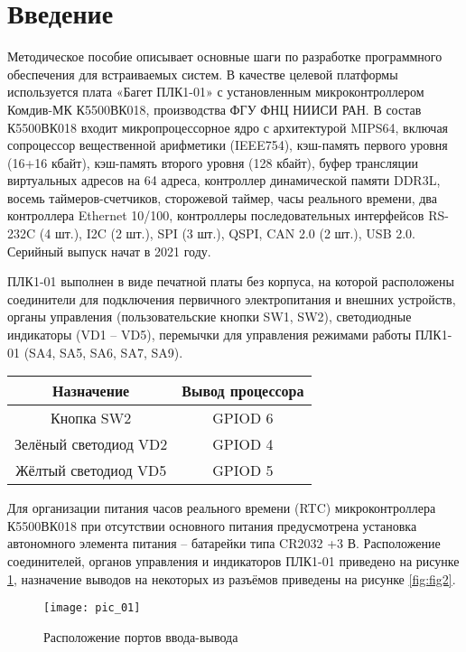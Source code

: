 \chapter*{Введение}
Методическое пособие описывает основные шаги по разработке программного обеспечения для встраиваемых систем. В качестве целевой платформы используется плата «Багет ПЛК1-01» с установленным микроконтроллером Комдив-МК К5500ВК018, производства ФГУ ФНЦ НИИСИ РАН. В состав К5500ВК018 входит микропроцессорное ядро с архитектурой MIPS64, включая сопроцессор вещественной арифметики (IEEE754), кэш-память первого уровня (16+16 кбайт), кэш-память второго уровня (128 кбайт), буфер трансляции виртуальных адресов на 64 адреса, контроллер динамической памяти DDR3L, восемь таймеров-счетчиков, сторожевой таймер, часы реального времени, два контроллера Ethernet 10/100, контроллеры последовательных интерфейсов RS-232C (4 шт.), I2C (2 шт.), SPI (3 шт.), QSPI, CAN 2.0 (2 шт.), USB 2.0. Серийный выпуск начат в 2021 году. 

ПЛК1-01 выполнен в виде печатной платы без корпуса, на которой расположены
соединители для подключения первичного электропитания и внешних устройств, органы
управления (пользовательские кнопки SW1, SW2), светодиодные индикаторы (VD1 –
VD5), перемычки для управления режимами работы ПЛК1-01 (SA4, SA5, SA6, SA7, SA9). 

\begin{center}
	\begin{tabular}{||c | c||}
		\hline
		Назначение & Вывод процессора \\ [0.5ex]
		\hline\hline
		Кнопка SW2 & GPIOD 6 \\
		\hline
		Зелёный светодиод VD2 & GPIOD 4 \\
		\hline
		Жёлтый светодиод VD5 & GPIOD 5 \\
		\hline
	\end{tabular}
\end{center}

Для организации питания часов реального времени (RTC) микроконтроллера
К5500ВК018 при отсутствии основного питания предусмотрена установка
автономного элемента питания – батарейки типа CR2032 +3 В.
Расположение соединителей, органов управления и индикаторов ПЛК1-01
приведено на рисунке \ref{fig:fig1}, назначение выводов на некоторых из разъёмов приведены на рисунке \ref{fig:fig2}.

\begin{figure}
	\centering\texttt{[image: pic\_01]}
	\caption{Расположение портов ввода-вывода}
	\label{fig:fig1}
\end{figure}


